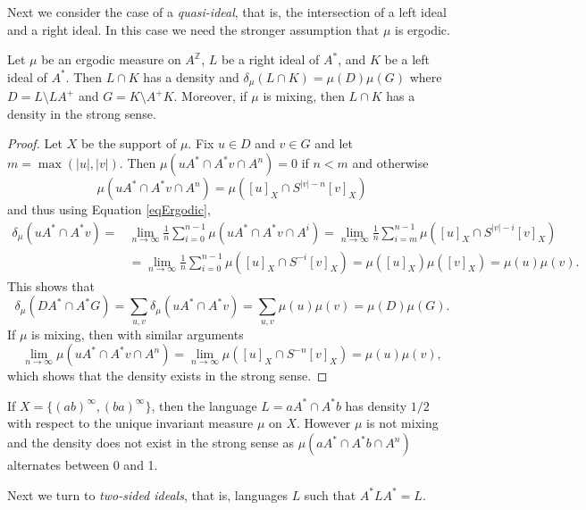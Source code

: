 \documentclass[a4paper,UKenglish,numberwithinsect,cleveref]{lipics-v2021}
\newcommand{\Z}{\mathbb{Z}}
\begin{document}
Next we consider the case of a \emph{quasi-ideal}, that is, the intersection of a left
ideal and a right ideal. In this case we need the stronger assumption that $\mu$ is ergodic.

\begin{proposition}\label{propositionQuasiIdeal}
    Let $\mu$ be an ergodic measure on $A^\Z$, $L$ be a right ideal of $A^*$, and $K$ be a left ideal of $A^*$. Then $L\cap K$ has a density and $\delta_\mu(L\cap K)=\mu(D)\mu(G)$ where $D = L\setminus LA^+$ and $G = K\setminus A^+K$. Moreover, if $\mu$ is mixing, then $L\cap K$ has a density in the strong sense.
\end{proposition}

\begin{proof}
    Let $X$ be the support of $\mu$. Fix $u\in D$ and $v\in G$ and let $m=\max(|u|,|v|)$. Then $\mu(uA^*\cap A^*v\cap A^n)=0$ if $n<m$ and otherwise
    \begin{displaymath}
        \mu(uA^*\cap A^*v\cap A^n)=\mu([u]_X\cap S^{|v|-n}[v]_X)
    \end{displaymath}
    and thus using Equation \eqref{eqErgodic},
    \begin{align*}
        \delta_\mu(uA^*\cap A^*v)=&\lim_{n\to\infty}\frac{1}{n}\sum_{i=0}^{n-1}\mu(uA^*\cap A^*v\cap A^i) 
        = \lim_{n\to\infty}\frac{1}{n}\sum_{i=m}^{n-1}\mu([u]_X\cap S^{|v|-i}[v]_X)\\
        &= \lim_{n\to\infty}\frac{1}{n}\sum_{i=0}^{n-1}\mu([u]_X\cap S^{-i}[v]_X)
        =\mu([u]_X)\mu([v]_X)=\mu(u)\mu(v).
    \end{align*}
    This shows that
    \[
        \delta_\mu(DA^*\cap A^*G)=\sum_{u,v}\delta_\mu(uA^*\cap A^*v)=\sum_{u,v}\mu(u)\mu(v)=\mu(D)\mu(G).
    \]
    If $\mu$ is mixing, then with similar arguments
    \[
        \lim_{n\to\infty} \mu(uA^*\cap A^*v\cap A^n)=\lim_{n\to\infty}\mu([u]_X\cap S^{-n}[v]_X)=\mu(u)\mu(v),
    \]
    which shows that the density exists in the strong sense. 
\end{proof}

\begin{example}\label{ex:not-mixing}
    If $X=\{(ab)^\infty, (ba)^\infty\}$, then the language $L=aA^*\cap A^*b$ has density $1/2$ with respect to the unique invariant measure $\mu$ on $X$. However $\mu$ is not mixing and the density does not exist in the strong sense as $\mu(aA^*\cap A^*b\cap A^n)$ alternates between 0 and 1.
\end{example}

Next we turn to \emph{two-sided ideals}, that is, languages $L$ such that $A^*LA^*=L$. 
\end{document}

